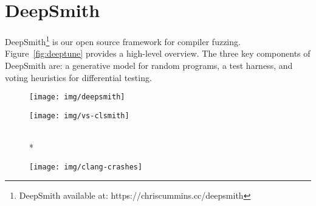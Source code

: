 \section{DeepSmith}

DeepSmith\footnote{DeepSmith available at: https://chriscummins.cc/deepsmith}
is our open source framework for compiler fuzzing. Figure~\ref{fig:deeptune}
provides a high-level overview. The three key components of DeepSmith are: a
generative model for random programs, a test harness, and voting heuristics for
differential testing.

\begin{figure}[t!]
  \centering
  \begin{minipage}{.5\textwidth}
    \centering
    \vspace{-2em}
    \texttt{[image: img/deepsmith]}
    \vspace{-4em}
    \label{fig:deeptune}
  \end{minipage}%
  \begin{minipage}{.5\textwidth}
    \centering
    \vspace{-14em}
    \texttt{[image: img/vs-clsmith]}
    \vspace{-2.7em}
    \label{fig:vs_clsmith}
  \end{minipage}\\*
  \begin{flushright}
    \begin{minipage}{.5\textwidth}
      \centering
      \vspace{-12em}
      \texttt{[image: img/clang-crashes]}
      \vspace{-2em}
      \label{fig:clangs}
    \end{minipage}
  \end{flushright}
\end{figure}

\vspace{-.5em}
